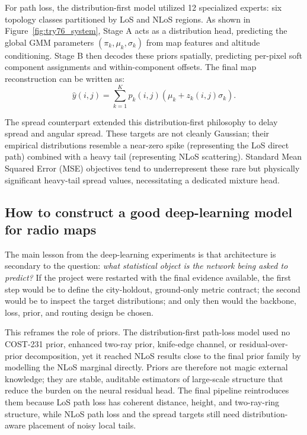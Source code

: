 For path loss, the distribution-first model utilized 12 specialized experts: six topology classes partitioned by LoS
and NLoS regions. As shown in Figure~\ref{fig:try76_system}, Stage A acts as a distribution head, predicting the global GMM parameters
$(\pi_k,\mu_k,\sigma_k)$ from map features and altitude conditioning.
Stage B then decodes these priors spatially, predicting per-pixel soft component assignments and within-component
offsets. The final map reconstruction can be written as:
\begin{equation}
  \hat y(i,j)
  =
  \sum_{k=1}^{K} p_k(i,j)
  \left(\mu_k + z_k(i,j)\sigma_k\right).
  \label{eq:gmm_reconstruction}
\end{equation}

The spread counterpart extended this distribution-first philosophy to delay spread and angular spread. These targets
are not cleanly Gaussian; their empirical distributions resemble a near-zero spike (representing the LoS direct path) combined with a
heavy tail (representing NLoS scattering). Standard Mean Squared Error (MSE) objectives tend to underrepresent these rare
but physically significant heavy-tail spread values, necessitating a dedicated mixture head.

\subsection{How to construct a good deep-learning model for radio maps}
\label{sec:good_dl_model_design}

The main lesson from the deep-learning experiments is that architecture is
secondary to the question: \emph{what statistical object is the network being
asked to predict?} If the project were restarted with the final evidence
available, the first step would be to define the city-holdout, ground-only
metric contract; the second would be to inspect the target distributions; and
only then would the backbone, loss, prior, and routing design be chosen.

This reframes the role of priors. The distribution-first path-loss model used
no COST-231 prior, enhanced two-ray prior, knife-edge channel, or
residual-over-prior decomposition, yet it reached NLoS results close to the
final prior family by modelling the NLoS marginal directly. Priors are
therefore not magic external knowledge; they are stable, auditable estimators
of large-scale structure that reduce the burden on the neural residual head.
The final pipeline reintroduces them because LoS path loss has coherent
distance, height, and two-ray-ring structure, while NLoS path loss and the
spread targets still need distribution-aware placement of noisy local tails.

